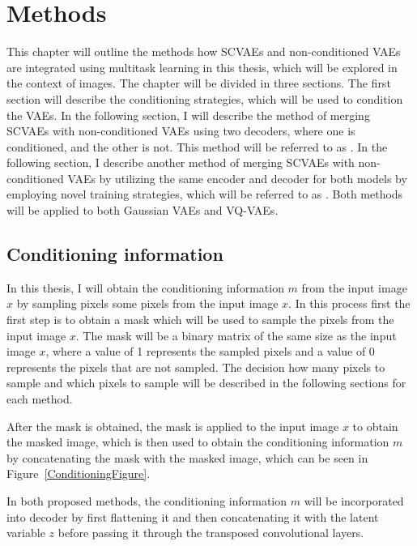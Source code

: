 \chapter{Methods}

This chapter will outline the methods how SCVAEs and non-conditioned VAEs are integrated using multitask learning in this thesis, which will be explored in the context of images. 
The chapter will be divided in three sections. The first section will describe the conditioning strategies, which will be used to condition the VAEs. In the following section, I will describe the method of merging SCVAEs with non-conditioned VAEs using two decoders, where one is conditioned, and the other is not. This method will be referred to as . In the following section, I describe another method of merging SCVAEs with non-conditioned VAEs by utilizing the same encoder and decoder for both models by employing novel training strategies, which will be referred to as . Both methods will be applied to both Gaussian VAEs and VQ-VAEs.

\section{Conditioning information}

In this thesis, I will obtain the conditioning information $m$ from the input image $x$ by sampling pixels some pixels from the input image $x$. In this process first the first step is to obtain a mask which will be used to sample the pixels from the input image $x$. The mask will be a binary matrix of the same size as the input image $x$, where a value of 1 represents the sampled pixels and a value of 0 represents the pixels that are not sampled. The decision how many pixels to sample and which pixels to sample will be described in the following sections for each method.

After the mask is obtained, the mask is applied to the input image $x$ to obtain the masked image, which is then used to obtain the conditioning information $m$ by concatenating the mask with the masked image, which can be seen in Figure~\ref{ConditioningFigure}.

In both proposed methods, the conditioning information $m$ will be incorporated into decoder by first flattening it and then concatenating it with the latent variable $z$ before passing it through the transposed convolutional layers. 

